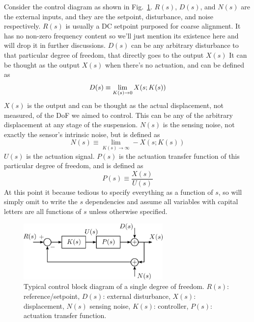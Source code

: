 Consider the control diagram as shown in Fig.~\ref{fig:generalcontrolblockdiagram}.
$R(s)$, $D(s)$, and $N(s)$ are the external inputs, and they are the setpoint, disturbance, and noise respectively.
$R(s)$ is usually a DC setpoint purposed for coarse alignment.
It has no non-zero frequency content so we'll just mention its existence here and will drop it in further discussions.
$D(s)$ can be any arbitrary disturbance to that particular degree of freedom, that directly goes to the output $X(s)$
It can be thought as the output $X(s)$ when there's no actuation, and can be defined as
\begin{equation}
	D(s) \equiv \lim_{K(s)\to 0} X\mleft(s;K(s)\mright)
\end{equation}
$X(s)$ is the output and can be thought as the actual displacement, not measured, of the DoF we aimed to control.
This can be any of the arbitrary displacement at any stage of the suspension.
$N(s)$ is the sensing noise, not exactly the sensor's intrinsic noise, but is defined as
\begin{equation}
	N(s) \equiv \lim_{K(s)\to\infty} -X(s;K(s))
\end{equation}
$U(s)$ is the actuation signal.
$P(s)$ is the actuation transfer function of this particular degree of freedom, and is defined as
\begin{equation}
	P(s) \equiv \frac{X(s)}{U(s)}
\end{equation}
At this point it because tedious to specify everything as a function of $s$, so will simply omit to write the $s$ dependencies and assume all variables with capital letters are all functions of $s$ unless otherwise specified.
\begin{figure}[!h]
	\centering
	\includegraphics[width=75mm]{figures/general_control_block_diagram}
	\caption{Typical control block diagram of a single degree of freedom. $R(s)$: reference/setpoint, $D(s)$: external disturbance, $X(s)$: displacement, $N(s)$ sensing noise, $K(s)$: controller, $P(s)$: actuation transfer function.}
	\label{fig:generalcontrolblockdiagram}
\end{figure}


